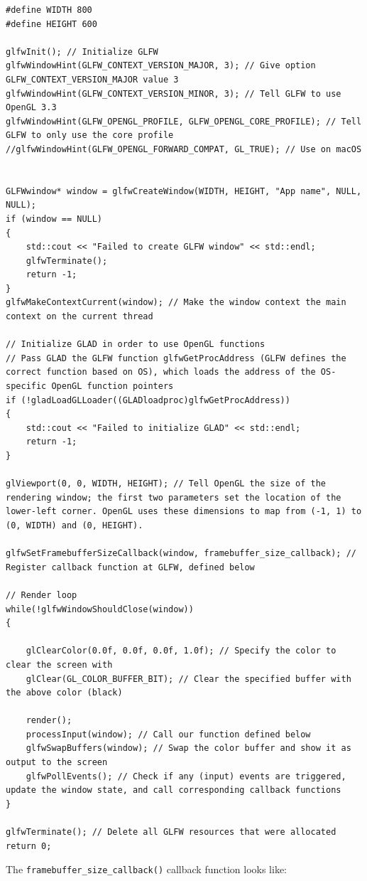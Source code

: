 \documentclass[table, xcdraw]{article}%
\begin{document}
\begin{verbatim}
#define WIDTH 800
#define HEIGHT 600

glfwInit(); // Initialize GLFW
glfwWindowHint(GLFW_CONTEXT_VERSION_MAJOR, 3); // Give option GLFW_CONTEXT_VERSION_MAJOR value 3
glfwWindowHint(GLFW_CONTEXT_VERSION_MINOR, 3); // Tell GLFW to use OpenGL 3.3
glfwWindowHint(GLFW_OPENGL_PROFILE, GLFW_OPENGL_CORE_PROFILE); // Tell GLFW to only use the core profile
//glfwWindowHint(GLFW_OPENGL_FORWARD_COMPAT, GL_TRUE); // Use on macOS


GLFWwindow* window = glfwCreateWindow(WIDTH, HEIGHT, "App name", NULL, NULL);
if (window == NULL)
{
    std::cout << "Failed to create GLFW window" << std::endl;
    glfwTerminate();
    return -1;
}
glfwMakeContextCurrent(window); // Make the window context the main context on the current thread

// Initialize GLAD in order to use OpenGL functions
// Pass GLAD the GLFW function glfwGetProcAddress (GLFW defines the correct function based on OS), which loads the address of the OS-specific OpenGL function pointers
if (!gladLoadGLLoader((GLADloadproc)glfwGetProcAddress))
{
    std::cout << "Failed to initialize GLAD" << std::endl;
    return -1;
}

glViewport(0, 0, WIDTH, HEIGHT); // Tell OpenGL the size of the rendering window; the first two parameters set the location of the lower-left corner. OpenGL uses these dimensions to map from (-1, 1) to (0, WIDTH) and (0, HEIGHT).

glfwSetFramebufferSizeCallback(window, framebuffer_size_callback); // Register callback function at GLFW, defined below

// Render loop
while(!glfwWindowShouldClose(window))
{
    
    glClearColor(0.0f, 0.0f, 0.0f, 1.0f); // Specify the color to clear the screen with
    glClear(GL_COLOR_BUFFER_BIT); // Clear the specified buffer with the above color (black)

    render();
    processInput(window); // Call our function defined below
    glfwSwapBuffers(window); // Swap the color buffer and show it as output to the screen
    glfwPollEvents(); // Check if any (input) events are triggered, update the window state, and call corresponding callback functions
}

glfwTerminate(); // Delete all GLFW resources that were allocated
return 0;
\end{verbatim}

The \texttt{framebuffer_size_callback()} callback function looks like:
\end{document}
